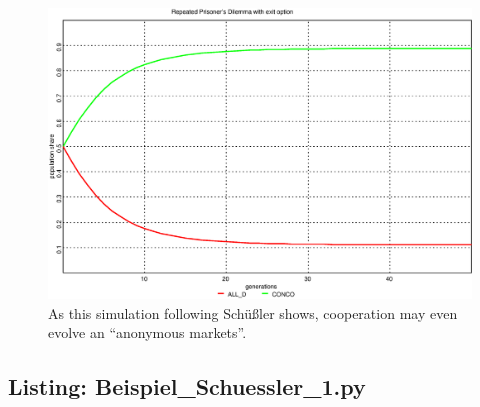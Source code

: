 \begin{figure}
\begin{center}
\includegraphics[width=20cm]{images/schuessler1.eps}
\caption{\label{schuessler1} As this simulation following Schüßler
  \cite[]{schuessler:1997} shows, cooperation may even evolve an ``anonymous
  markets''.}
\end{center}
\end{figure}

\newpage

\subsection{Listing: Beispiel\_Schuessler\_1.py}

